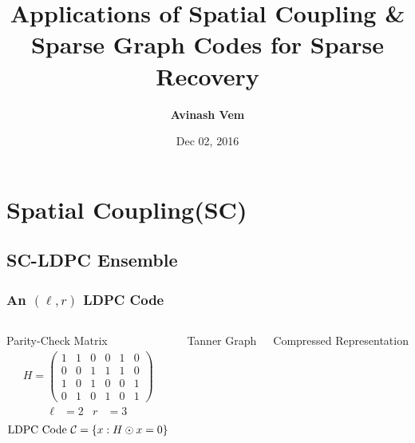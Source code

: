 \documentclass[10pt,presentation]{beamer}
\begin{document}
\title{\bf Applications of Spatial Coupling \& \\ Sparse Graph Codes for Sparse Recovery}
\author{\textbf{Avinash Vem}} 
\vspace{10pt}
\date{Dec 02, 2016} %



\frame{\titlepage}
\section{Spatial Coupling(SC)}
\subsection{SC-LDPC Ensemble}
\begin{frame}\frametitle{An $(\ell,r)$ LDPC Code}
\begin{columns}
\begin{defn}{Parity-Check Matrix}
\centering
\begin{align*}
H=
\begin{pmatrix}
1 & 1 & 0 & 0 & 1 & 0\\
0 & 0 & 1 & 1 & 1 & 0\\
1 & 0 & 1 & 0 & 0 & 1\\
0 & 1 & 0 & 1 & 0 & 1  
\end{pmatrix}
\end{align*}
\begin{align*}
  \ell&=2 & r&=3
\end{align*}
\begin{align*}
\text{LDPC Code } \mathcal{C}=\{x: H\odot x=0 \}
\end{align*}
\end{defn}
\begin{defn}{Tanner Graph}
\centering
\vspace{0.6cm}
\scalebox{0.65}{}
\end{defn}
\vspace{0.3cm}
\begin{defn}{Compressed Representation}
\centering
\vspace{0.3cm}
\scalebox{0.65}{}  
\end{defn}
\end{columns}
\end{frame}
\end{document}
